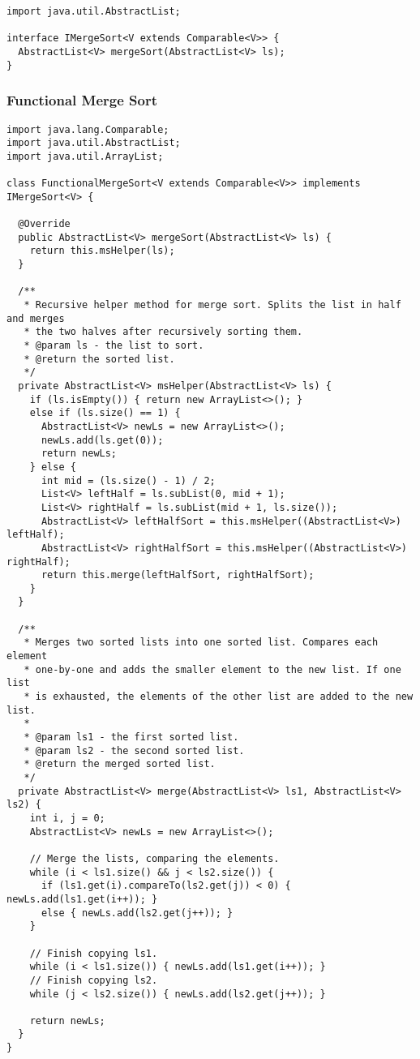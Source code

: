 \begin{lstlisting}[language=MyJava]
import java.util.AbstractList;

interface IMergeSort<V extends Comparable<V>> {
  AbstractList<V> mergeSort(AbstractList<V> ls);
}
\end{lstlisting}

\subsubsection*{Functional Merge Sort}
\begin{lstlisting}[language=MyJava]
import java.lang.Comparable;
import java.util.AbstractList;
import java.util.ArrayList;
  
class FunctionalMergeSort<V extends Comparable<V>> implements IMergeSort<V> {
  
  @Override
  public AbstractList<V> mergeSort(AbstractList<V> ls) {
    return this.msHelper(ls);
  }
  
  /**
   * Recursive helper method for merge sort. Splits the list in half and merges
   * the two halves after recursively sorting them.
   * @param ls - the list to sort.
   * @return the sorted list.
   */
  private AbstractList<V> msHelper(AbstractList<V> ls) {
    if (ls.isEmpty()) { return new ArrayList<>(); }
    else if (ls.size() == 1) {
      AbstractList<V> newLs = new ArrayList<>();
      newLs.add(ls.get(0));
      return newLs;
    } else {
      int mid = (ls.size() - 1) / 2;
      List<V> leftHalf = ls.subList(0, mid + 1);
      List<V> rightHalf = ls.subList(mid + 1, ls.size());
      AbstractList<V> leftHalfSort = this.msHelper((AbstractList<V>) leftHalf);
      AbstractList<V> rightHalfSort = this.msHelper((AbstractList<V>) rightHalf);
      return this.merge(leftHalfSort, rightHalfSort);
    }
  }
  
  /**
   * Merges two sorted lists into one sorted list. Compares each element 
   * one-by-one and adds the smaller element to the new list. If one list 
   * is exhausted, the elements of the other list are added to the new list.
   *
   * @param ls1 - the first sorted list.
   * @param ls2 - the second sorted list.
   * @return the merged sorted list.
   */
  private AbstractList<V> merge(AbstractList<V> ls1, AbstractList<V> ls2) {
    int i, j = 0;
    AbstractList<V> newLs = new ArrayList<>();
          
    // Merge the lists, comparing the elements.
    while (i < ls1.size() && j < ls2.size()) {
      if (ls1.get(i).compareTo(ls2.get(j)) < 0) { newLs.add(ls1.get(i++)); }
      else { newLs.add(ls2.get(j++)); }
    }
  
    // Finish copying ls1.
    while (i < ls1.size()) { newLs.add(ls1.get(i++)); }
    // Finish copying ls2.
    while (j < ls2.size()) { newLs.add(ls2.get(j++)); }

    return newLs;
  }
}
\end{lstlisting}

